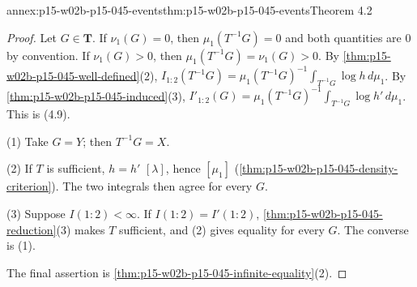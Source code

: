 \begin{annexitem}{annex:p15-w02b-p15-045-events}{thm:p15-w02b-p15-045-events}{Theorem 4.2}
\begin{proof}
Let \(G\in\mathbf T\). If \(\nu_1(G)=0\), then \(\mu_1(T^{-1}G)=0\) and
both quantities are \(0\) by convention. If \(\nu_1(G)>0\), then
\(\mu_1(T^{-1}G)=\nu_1(G)>0\). By
\cref{thm:p15-w02b-p15-045-well-defined}(2),
\(I_{1:2}(T^{-1}G)=\mu_1(T^{-1}G)^{-1}\int_{T^{-1}G}\log h\,d\mu_1\). By
\cref{thm:p15-w02b-p15-045-induced}(3),
\(I'_{1:2}(G)=\mu_1(T^{-1}G)^{-1}\int_{T^{-1}G}\log h'\,d\mu_1\). This is
(4.9).

(1) Take \(G=Y\); then \(T^{-1}G=X\).

(2) If \(T\) is sufficient, \(h=h'\) \([\lambda]\), hence \([\mu_1]\)
(\cref{thm:p15-w02b-p15-045-density-criterion}). The two integrals then
agree for every \(G\).

(3) Suppose \(I(1:2)<\infty\). If \(I(1:2)=I'(1:2)\),
\cref{thm:p15-w02b-p15-045-reduction}(3) makes \(T\) sufficient, and
(2) gives equality for every \(G\). The converse is (1).

The final assertion is \cref{thm:p15-w02b-p15-045-infinite-equality}(2).
\end{proof}
\end{annexitem}

